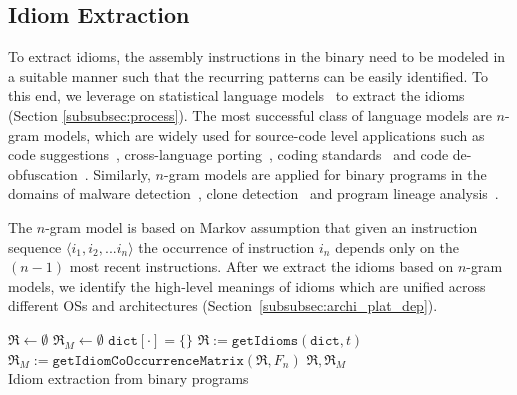 \subsection{Idiom Extraction} \label{subsec:idi_extr}
To extract idioms, the assembly instructions in the binary need to be modeled in a suitable manner such that the recurring patterns can be easily identified. To this end, we leverage on statistical language models~\cite{hindle2012naturalness} to extract the idioms (Section \ref{subsubsec:process}). The most successful class of language models are $n$-gram models, which are widely used for source-code level applications such as code suggestions~\cite{karaivanov2014phrase}, cross-language porting~\cite{nguyen2013lexical}, coding standards~\cite{allamanis2014learning} and code de-obfuscation~\cite{raychev2015predicting}. Similarly, $n$-gram models are applied for binary programs in the domains of malware detection~\cite{jang2011bitshred}, clone detection~\cite{saebjornsen2009detecting} and program lineage analysis~\cite{DBLP:conf/uss/JangWB13}.

The $n$-gram model is based on Markov assumption that given an instruction sequence $\langle i_1,i_2, ...i_n \rangle$ the occurrence of instruction $i_n$ depends only on the $(n-1)$ most recent instructions.
After we extract the idioms based on $n$-gram models, we identify the high-level meanings of idioms
which are unified across different OSs and architectures (Section~\ref{subsubsec:archi_plat_dep}). 

\begin{MyAlgo}[t]{-4.9cm} %
\small
 \DontPrintSemicolon
   $\Re \longleftarrow \emptyset$ \;
   $\Re_M \longleftarrow \emptyset$ \;
   $\mathtt{dict[\cdot]=\lbrace\rbrace}$ 
   $\Re := \mathtt{getIdioms}(\mathtt{dict},t)$ 
   $\Re_M := \mathtt{getIdiomCoOccurrenceMatrix}(\Re,F_n)$\;
  \Return ${\Re, \Re_M}$
  \\
 \caption{Idiom extraction from binary programs}\label{algo:idiom-ext}
\end{MyAlgo}

